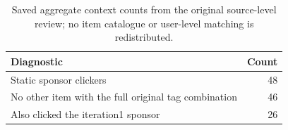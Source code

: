 \begin{table}[htbp!]
\centering
\small
\setlength{\tabcolsep}{3pt}
\renewcommand{\arraystretch}{1.1}
\begin{tabular}{lr}
\hline
Diagnostic & Count \\
\hline
Static sponsor clickers & 48 \\
No other item with the full original tag combination & 46 \\
Also clicked the iteration1 sponsor & 26 \\
\hline
\end{tabular}
\caption{Saved aggregate context counts from the original source-level review; no item catalogue or user-level matching is redistributed.}
\label{chap:results:tab:rq1_seed44_spike_context}
\end{table}

